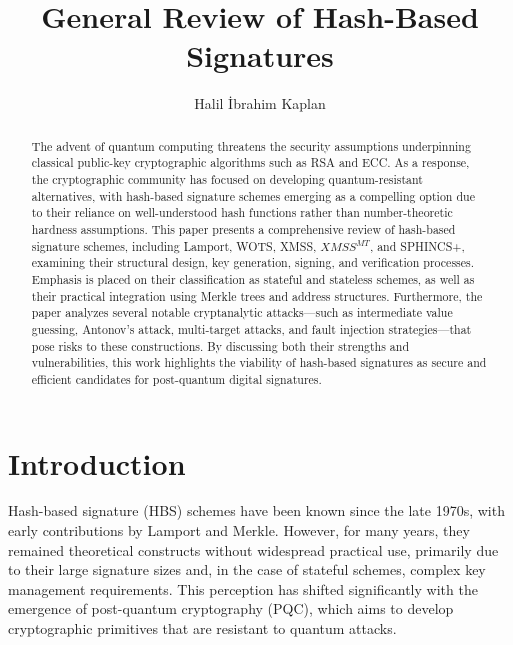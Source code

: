 \documentclass[runningheads]{llncs}
\begin{document}
\title{General Review of Hash-Based Signatures }

\author{Halil İbrahim Kaplan}


\maketitle

\begin{abstract}
The advent of quantum computing threatens the security assumptions underpinning classical public-key cryptographic algorithms such as RSA and ECC. As a response, the cryptographic community has focused on developing quantum-resistant alternatives, with hash-based signature schemes emerging as a compelling option due to their reliance on well-understood hash functions rather than number-theoretic hardness assumptions. This paper presents a comprehensive review of hash-based signature schemes, including Lamport, WOTS, XMSS, $XMSS^{MT}$, and SPHINCS+, examining their structural design, key generation, signing, and verification processes. Emphasis is placed on their classification as stateful and stateless schemes, as well as their practical integration using Merkle trees and address structures. Furthermore, the paper analyzes several notable cryptanalytic attacks—such as intermediate value guessing, Antonov’s attack, multi-target attacks, and fault injection strategies—that pose risks to these constructions. By discussing both their strengths and vulnerabilities, this work highlights the viability of hash-based signatures as secure and efficient candidates for post-quantum digital signatures.

\end{abstract}

\section{Introduction}

Hash-based signature (HBS) schemes have been known since the late 1970s, with early contributions by Lamport and Merkle. However, for many years, they remained theoretical constructs without widespread practical use, primarily due to their large signature sizes and, in the case of stateful schemes, complex key management requirements. This perception has shifted significantly with the emergence of post-quantum cryptography (PQC), which aims to develop cryptographic primitives that are resistant to quantum attacks.
\end{document}
